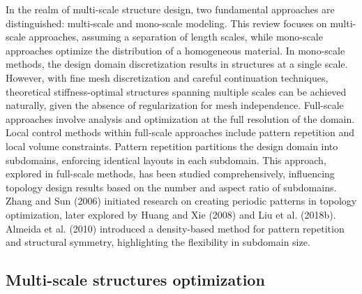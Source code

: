 In the realm of multi-scale structure design, two fundamental approaches are distinguished: multi-scale and mono-scale modeling. This review focuses on multi-scale approaches, assuming a separation of length scales, while mono-scale approaches optimize the distribution of a homogeneous material. In mono-scale methods, the design domain discretization results in structures at a single scale. However, with fine mesh discretization and careful continuation techniques, theoretical stiffness-optimal structures spanning multiple scales can be achieved naturally, given the absence of regularization for mesh independence. Full-scale approaches involve analysis and optimization at the full resolution of the domain. Local control methods within full-scale approaches include pattern repetition and local volume constraints. Pattern repetition partitions the design domain into subdomains, enforcing identical layouts in each subdomain. This approach, explored in full-scale methods, has been studied comprehensively, influencing topology design results based on the number and aspect ratio of subdomains. Zhang and Sun (2006) initiated research on creating periodic patterns in topology optimization, later explored by Huang and Xie (2008) and Liu et al. (2018b). Almeida et al. (2010) introduced a density-based method for pattern repetition and structural symmetry, highlighting the flexibility in subdomain size.











\subsection{Multi-scale structures optimization}

